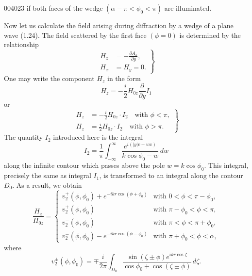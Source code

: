 \begin{scanpage}{0040}{23}
if both faces of the wedge $(\alpha-\pi<\phi_0<\pi)$ are illuminated.

Now let us calculate the field arising during diffraction by a wedge of a plane wave (1.24). The field scattered by the first face $(\phi=0)$ is determined by the relationship
\[\left.\begin{aligned}H_z&=-\frac{\partial A_x}{\partial y},\\H_x&=H_y=0.\end{aligned}\right\}\tag{3.23}\]
One may write the component $H_z$ in the form
\[H_z=-\frac i2H_{0z}\frac\partial{\partial y}I_1\tag{3.24}\]
or
\[\left.\begin{aligned}H_z&=-\frac i2H_{0z}\cdot I_2\quad\text{with }\phi<\pi,\\H_z&=\frac i2H_{0z}\cdot I_2\quad\text{with }\phi>\pi.\end{aligned}\right\}\tag{3.25}\]
The quantity $I_2$ introduced here is the integral
\[I_2=\frac1\pi\int_{-\infty}^{\infty}\frac{e^{i(|y|v-wx)}}{k\cos\phi_0-w}\,dw\tag{3.26}\]
along the infinite contour which passes above the pole $w=k\cos\phi_0$. This integral, precisely the same as integral $I_1$, is transformed to an integral along the contour $D_0$. As a result, we obtain
\[\frac{H_z}{H_{0z}}=\begin{cases}v_2^+(\phi,\phi_0)+e^{-ikr\cos(\phi+\phi_0)}&\text{with }0<\phi<\pi-\phi_0,\\v_2^+(\phi,\phi_0)&\text{with }\pi-\phi_0<\phi<\pi,\\v_2^-(\phi,\phi_0)&\text{with }\pi<\phi<\pi+\phi_0,\\v_2^-(\phi,\phi_0)-e^{-ikr\cos(\phi-\phi_0)}&\text{with }\pi+\phi_0<\phi<\alpha,\end{cases}\tag{3.27}\]
where
\[v_2^{\pm}(\phi,\phi_0)=\mp\frac i{2\pi}\int_{D_0}\frac{\sin(\zeta\pm\phi)e^{ikr\cos\zeta}}{\cos\phi_0+\cos(\zeta\pm\phi)}\,d\zeta.\tag{3.28}\]
\end{scanpage}
